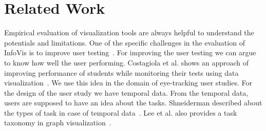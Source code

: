 \section{Related Work}

Empirical evaluation of visualization tools are always helpful to understand the potentials and limitations. One of the specific challenges in the evaluation of InfoVis is to improve user testing~\cite{plaisant2004challenge}. For improving the user testing we can argue to know how well the user performing. Costagiola et al. shows an approach of improving performance of students while monitoring their tests using data visualization~\cite{costagliola2009monitoring}. We use this idea in the domain of eye-tracking user studies. For the design of the user study we have temporal data. From the temporal data, users are supposed to have an idea about the tasks. Shneiderman described about the types of task in case of temporal data~\cite{shneiderman1996eyes}. Lee et al. also provides a task taxonomy in graph visualization~\cite{lee2006task}. 

